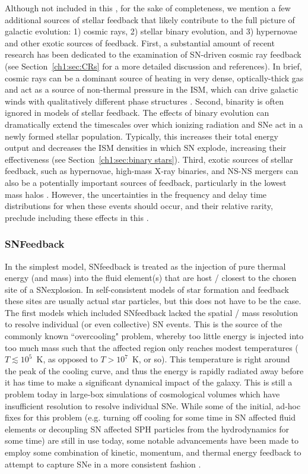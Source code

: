 Although not included in this \Dissertation, for the sake of completeness, we mention a few additional sources of stellar feedback that likely contribute to the full picture of galactic evolution: 1) cosmic rays, 2) stellar binary evolution, and 3) hypernovae and other exotic sources of feedback. First, a substantial amount of recent research has been dedicated to the examination of SN-driven cosmic ray feedback (see Section~\ref{ch1:sec:CRs} for a more detailed discussion and references). In brief, cosmic rays can be a dominant source of heating in very dense, optically-thick gas and act as a source of non-thermal pressure in the ISM, which can drive galactic winds with qualitatively different phase structures \citep[e.g.][]{SalemBryanCorlies}. Second, binarity is often ignored in models of stellar feedback. The effects of binary evolution can dramatically extend the timescales over which ionizing radiation and SNe act in a newly formed stellar population. Typically, this increases their total energy output and decreases the ISM densities in which SN explode, increasing their effectiveness (see Section~\ref{ch1:sec:binary stars}). Third, exotic sources of stellar feedback, such as hypernovae, high-mass X-ray binaries, and NS-NS mergers can also be a potentially important sources of feedback, particularly in the lowest mass halos \citep[e.g.][]{Artale2015}. However, the uncertainties in the frequency and delay time distributions for when these events should occur, and their relative rarity, preclude including these effects in this \Dissertation.

\subsubsection{SNFeedback}
\label{intro:sec:SNe}

In the simplest model, SNfeedback is treated as the injection of pure thermal energy (and mass) into the fluid element(s) that are host / closest to the chosen site of a SNexplosion. In self-consistent models of star formation and feedback these sites are usually actual star particles, but this does not have to be the case. The first models which included SNfeedback lacked the spatial / mass resolution to resolve individual (or even collective) SN events. This is the source of the commonly known ``overcooling" problem, whereby too little energy is injected into too much mass such that the affected region only reaches modest temperatures ($T \lesssim 10^5$~K, as opposed to $T > 10^7$~K, or so). This temperature is right around the peak of the cooling curve, and thus the energy is rapidly radiated away before it has time to make a significant dynamical impact of the galaxy. This is still a problem today in large-box simulations of cosmological volumes which have insufficient resolution to resolve individual SNe. While some of the initial, ad-hoc fixes for this problem (e.g. turning off cooling for some time in SN affected fluid elements or decoupling SN affected SPH particles from the hydrodynamics for some time) are still in use today, some notable advancements have been made to employ some combination of kinetic, momentum, and thermal energy feedback to attempt to capture SNe in a more consistent fashion \citep[e.g.][]{FIRE,Simpson2015,Hopkins2018}.

